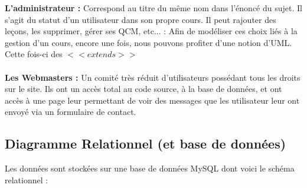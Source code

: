 \documentclass[a4paper,11pt]{article}
\begin{document}
\textbf{L'administrateur :} Correspond au titre du même nom dans l'énoncé du sujet. Il s'agit du statut d'un utilisateur dans son propre cours. Il peut rajouter des leçons, les supprimer, gérer ses QCM, etc... :  Afin de modéliser ces choix liés à la gestion d'un cours, encore une fois, nous pouvons profiter d'une notion d'UML. Cette fois-ci des $<<extends>>$ \\\\

\textbf{Les Webmasters :} Un comité très réduit d'utilisateurs possédant tous les droits sur le site. Ils ont un accès total au code source, à la base de données, et ont accès à une page leur permettant de voir des messages que les utilisateur leur ont envoyé via un formulaire de contact.
\newpage
\subsection{Diagramme Relationnel (et base de données)}

Les données sont stockées sur une base de données MySQL dont voici le schéma relationnel : \\\\
\end{document}
